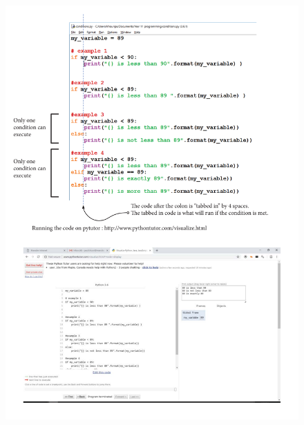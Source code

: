 \documentclass[a4paper,12pt]{article}
\begin{document}
 \begin{figure} [!h]
 	\centering
 	\includegraphics[width=17cm]{screen_shots/conditions.pdf}
 \end{figure}
\newpage

\end{document}
